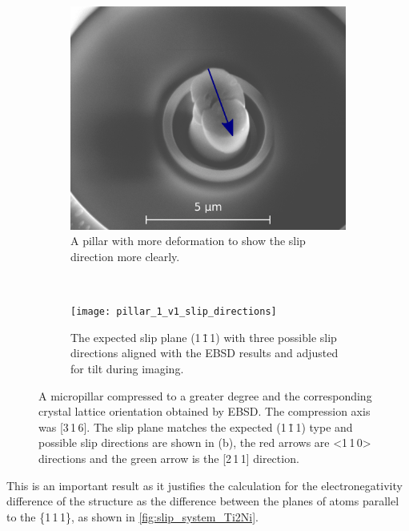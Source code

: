 \begin{figure}
\centering
\begin{subfigure}{0.4\textwidth}
    \centering
    \includegraphics[width=\textwidth]{pillar_1_v1}
    \caption{A pillar with more deformation to show the slip direction more clearly.}
\end{subfigure}
~
\begin{subfigure}{0.4\textwidth}
    \centering
    \texttt{[image: pillar\_1\_v1\_slip\_directions]}
    \caption{The expected slip plane  (1\,\={1}\,1) with three possible slip directions aligned with the EBSD results and adjusted for tilt during imaging.}
\end{subfigure}
\caption[A compressed micropillar of  showing the slip direction.]{A micropillar compressed to a greater degree and the corresponding crystal lattice orientation obtained by EBSD. The compression axis was [3\,1\,6]. The slip plane matches the expected (1\,\={1}\,1) type and possible slip directions are shown in (b), the red arrows are <1\,1\,0> directions and the green arrow is the [2\,1\,1] direction.\label{fig:slip_direction}}
\end{figure}

This is an important result as it justifies the calculation for the electronegativity difference of the structure as the difference between the planes of atoms parallel to the \{1\,1\,1\}, as shown in \autoref{fig:slip_system_Ti2Ni}.






